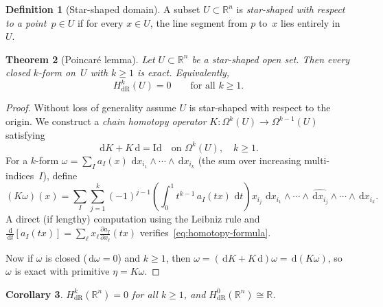 \documentclass[12pt,a4paper,openany]{book}
\newtheorem{theorem}{Theorem}[section]
\newtheorem{corollary}[theorem]{Corollary}
\theoremstyle{definition}
\newtheorem{definition}[theorem]{Definition}
\theoremstyle{remark}
\newcommand{\R}{\mathbb{R}}
\newcommand{\Id}{\mathrm{Id}}
\newcommand{\dd}{\,\mathrm{d}}
\begin{document}
\begin{definition}[Star-shaped domain]\label{def:star-shaped}
A subset $U\subset\R^n$ is \emph{star-shaped with respect to a
point~$p\in U$} if for every $x\in U$, the line segment from $p$ to~$x$
lies entirely in~$U$.
\end{definition}

\begin{theorem}[Poincar\'e lemma]\label{thm:poincare-lemma}
Let $U\subset\R^n$ be a star-shaped open set.  Then every closed $k$-form
on~$U$ with $k\ge 1$ is exact.  Equivalently,
\[
  H^k_{\mathrm{dR}}(U) = 0 \qquad\text{for all } k\ge 1.
\]
\end{theorem}

\begin{proof}
Without loss of generality assume $U$ is star-shaped with respect to the
origin.  We construct a \emph{chain homotopy operator}
$K\colon\Omega^k(U)\to\Omega^{k-1}(U)$ satisfying
\begin{equation}\label{eq:homotopy-formula}
  \dd K + K\dd = \Id \quad\text{on } \Omega^k(U),\quad k\ge 1.
\end{equation}
For a $k$-form $\omega = \sum_{I} a_I(x)\,\dd x_{i_1}\wedge\cdots
\wedge\dd x_{i_k}$ (the sum over increasing multi-indices~$I$), define
\[
  (K\omega)(x) = \sum_I \sum_{j=1}^k (-1)^{j-1}
  \left(\int_0^1 t^{k-1}\, a_I(tx)\,\dd t\right)
  x_{i_j}\,\dd x_{i_1}\wedge\cdots\wedge\widehat{\dd x_{i_j}}\wedge
  \cdots\wedge\dd x_{i_k}.
\]
A direct (if lengthy) computation using the Leibniz rule and
$\frac{\dd}{\dd t}[a_I(tx)] = \sum_\ell x_\ell \frac{\partial a_I}{\partial x_\ell}(tx)$
verifies~\eqref{eq:homotopy-formula}.

Now if $\omega$ is closed ($\dd\omega = 0$) and $k\ge 1$,
then $\omega = (\dd K + K\dd)\omega = \dd(K\omega)$, so $\omega$
is exact with primitive $\eta = K\omega$.
\end{proof}

\begin{corollary}\label{cor:poincare-Rn}
$H^k_{\mathrm{dR}}(\R^n) = 0$ for all $k\ge 1$, and
$H^0_{\mathrm{dR}}(\R^n)\cong\R$.
\end{corollary}
\end{document}
